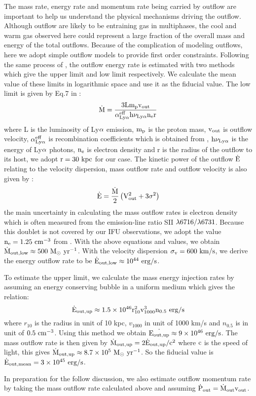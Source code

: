 \documentclass[../Results.tex]{subfiles}
\begin{document}
	The mass rate, energy rate and momentum rate being carried by outflow are important to help us understand the physical mechanisms driving the outflow. Although outflow are likely to be entraining gas in multiphases, the cool and warm gas observed here could represent a large fraction of the overall mass and energy of the total outflows. Because of the complication of modeling outflows, here we adopt simple outflow models to provide first order constraints. Following the same process of \citet{harrison2014kiloparsec}, the outflow energy rate is estimated with two methods which give the upper limit and low limit respectively. We calculate the mean value of these limits in logarithmic space and use it as the fiducial value. The low limit is given by Eq.7 in \citet{rodriguez2013importance}:
	\begin{equation}
		 \rm \dot{M}=\frac{3 L m_{p} v_{o u t}}{\alpha_{Ly \alpha}^{e f f} h \nu_{Ly \alpha} n_{e} r}
	\end{equation}
	where L is the luminosity of Ly$\rm \alpha$ emission, $\rm m_{p}$ is the proton mass, $\rm v_{o u t}$ is outflow velocity, $\rm \alpha_{Ly\alpha}^{eff}$ is recombination coefficients which is obtained from \cite{storey1995recombination}, $\rm h\nu_{Ly\alpha}$ is the energy of Ly$\rm \alpha$ photons, $\rm n_{e}$ is electron density and r is the radius of the outflow to its host, we adopt $\rm r=30 \ kpc$ for our case. The kinetic power of the outflow $\rm \dot{E}$ relating to the velocity dispersion, mass outflow rate and outflow velocity is also given by \citet{rodriguez2013importance}:
	\begin{equation}
		\rm  \dot{\mathrm{E}}=\frac{\dot{M}}{2}\left(V_{o u t}^{2}+3 \sigma^{2}\right)
	\end{equation}
	the main uncertainty in calculating the mass outflow rates is electron density which is often measured from the emission-line ratio SII $\rm \lambda6716/\lambda6731$. Because this doublet is not covered by our IFU observations, we adopt the value $\rm n_{e}=1.25 \ cm^{-3}$ from \citet{cai2017discovery}. With the above equations and values, we obtain $\rm \dot{M}_{out,low} \approx 500 \ M_{\odot} \ yr^{-1}$. With the velocity dispersion $\rm \sigma_{v}=600 \ km/s$, we derive the energy outflow rate to be $\rm \dot{E}_{out,low} \approx 10^{44} \ erg/s$.
	
	To estimate the upper limit, we calculate the mass energy injection rates by assuming an energy conserving bubble in a uniform medium \citep{heckman1990nature} which gives the relation:
	\begin{equation}
		\rm \dot{E}_{o u t, u p} \approx 1.5 \times 10^{46} r_{10}^{2}v_{1000}^{3} n_{0.5} \ erg/s
	\end{equation}
	where $r_{10}$ is the radius in unit of 10 kpc, $v_{1000}$ in unit of 1000 km/s and $n_{0.5}$ is in unit of $\rm 0.5 \ cm^{-3}$. Using this method we obtain $\rm \dot{E_{out,up}} \approx 9 \times 10^{46} \ erg/s$. The mass outflow rate is then given by $\rm \dot{M}_{out,up}=2 \dot{E}_{out,up}/c^{2}$ where $\rm c$ is the speed of light, this gives $\rm \dot{M}_{out,up} \approx 8.7 \times 10^{5} \ M_{\odot} \ yr^{-1}$. So the fiducial value is $\rm \dot{E}_{out,mean}=3 \times 10^{45} \ erg/s$.
	
	In preparation for the follow discussion, we also estimate outflow momentum rate by taking the mass outflow rate calculated above and assuming $\rm \dot{P}_{out}=\dot{M}_{out}v_{out}$.
\end{document}
